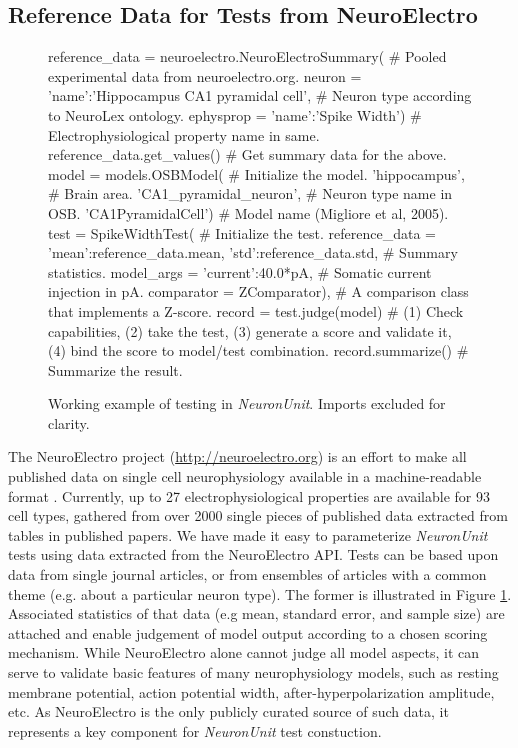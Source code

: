 \documentclass{frontiersSCNS}
\begin{document}
\subsection{Reference Data for Tests from NeuroElectro}\label{sec:neuroelectro} 
\begin{figure}
\begin{python}
reference_data = neuroelectro.NeuroElectroSummary( # Pooled experimental data from  neuroelectro.org. 
  neuron = {'name':'Hippocampus CA1 pyramidal cell'}, # Neuron type according to NeuroLex ontology.  
  ephysprop = {'name':'Spike Width'}) # Electrophysiological property name in same.
reference_data.get_values()  # Get summary data for the above. 
model = models.OSBModel( # Initialize the model.
        'hippocampus', # Brain area.  
        'CA1_pyramidal_neuron', # Neuron type name in OSB.  
        'CA1PyramidalCell') # Model name (Migliore et al, 2005).
test = SpikeWidthTest( # Initialize the test.    
	reference_data = {'mean':reference_data.mean, 'std':reference_data.std}, # Summary statistics.
	model_args = {'current':40.0*pA}, # Somatic current injection in pA.  
	comparator = ZComparator), # A comparison class that implements a Z-score.  
record = test.judge(model) # (1) Check capabilities, (2) take the test, (3) generate a score and validate it, (4) bind the score to model/test combination. 
record.summarize() # Summarize the result.  
\end{python}
\vspace{-15px}
\caption{Working example of testing in \textit{NeuronUnit}. Imports excluded for clarity.}
\label{fig:neuronunit_example}

\end{figure}
The NeuroElectro project (\url{http://neuroelectro.org}) is an effort to make all published data on single cell neurophysiology available in a machine-readable format \citep{tripathy_neuroelectro:_2012}.  
Currently, up to 27 electrophysiological properties are available for 93 cell types, gathered from over 2000 single pieces of published data extracted from tables in published papers. 
We have made it easy to parameterize \textit{NeuronUnit} tests using data extracted from the NeuroElectro API. 
Tests can be based upon data from single journal articles, or from ensembles of articles with a common theme (e.g. about a particular neuron type). 
The former is illustrated in Figure \ref{fig:neuronunit_example}. 
Associated statistics of that data (e.g mean, standard error, and sample size) are attached and enable judgement of model output according to a chosen scoring mechanism. 
While NeuroElectro alone cannot judge all model aspects, it can serve to validate basic features of many neurophysiology models, such as resting membrane potential, action potential width, after-hyperpolarization amplitude, etc. 
As NeuroElectro is the only publicly curated source of such data, it represents a key component for \textit{NeuronUnit} test constuction.  
\end{document}
